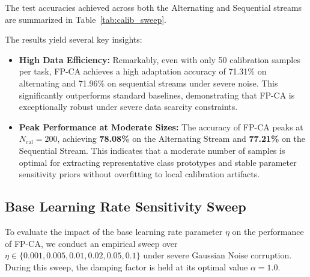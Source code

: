 \documentclass{article}
\theoremstyle{plain}
\theoremstyle{definition}
\theoremstyle{remark}
\begin{document}
The test accuracies achieved across both the Alternating and Sequential streams are summarized in Table~\ref{tab:calib_sweep}.

\begin{table}[h]
\centering
\caption{Sensitivity Analysis of Calibration Sample Size $N_{\text{cal}}$ (under Gaussian Noise)}
\label{tab:calib_sweep}
\vskip 0.1in
\begin{small}
\end{small}
\end{table}

The results yield several key insights:
\begin{itemize}
  \item \textbf{High Data Efficiency:} Remarkably, even with only 50 calibration samples per task, FP-CA achieves a high adaptation accuracy of 71.31\% on alternating and 71.96\% on sequential streams under severe noise. This significantly outperforms standard baselines, demonstrating that FP-CA is exceptionally robust under severe data scarcity constraints.
  \item \textbf{Peak Performance at Moderate Sizes:} The accuracy of FP-CA peaks at $N_{\text{cal}} = 200$, achieving \textbf{78.08\%} on the Alternating Stream and \textbf{77.21\%} on the Sequential Stream. This indicates that a moderate number of samples is optimal for extracting representative class prototypes and stable parameter sensitivity priors without overfitting to local calibration artifacts.
\end{itemize}

\subsection{Base Learning Rate Sensitivity Sweep}
To evaluate the impact of the base learning rate parameter $\eta$ on the performance of FP-CA, we conduct an empirical sweep over $\eta \in \{0.001, 0.005, 0.01, 0.02, 0.05, 0.1\}$ under severe Gaussian Noise corruption. During this sweep, the damping factor is held at its optimal value $\alpha = 1.0$.
\end{document}
